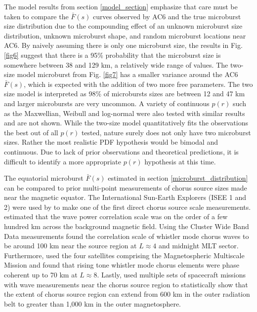 \documentclass[draft]{agujournal2019}
\begin{document}
The model results from section \ref{model_section} emphasize that care must be taken to compare the $\bar{F}(s)$ curves observed by AC6 and the true microburst size distribution due to the compounding effect of an unknown microburst size distribution, unknown microburst shape, and random microburst locations near AC6. By naively assuming there is only one microburst size, the results in Fig. \ref{fig6} suggest that there is a 95\% probability that the microburst size is somewhere between 38 and 129 km, a relatively wide range of values. The two-size model microburst from Fig. \ref{fig7} has a smaller variance around the AC6 $\bar{F}(s)$, which is expected with the addition of two more free parameters. The two size model is interpreted as 98\% of microbursts sizes are between 12 and 47 km and larger microbursts are very uncommon. A variety of continuous $p(r)$ such as the Maxwellian, Weibull and log-normal were also tested with similar results and are not shown. While the two-size model quantitatively fits the observations the best out of all $p(r)$ tested, nature surely does not only have two microburst sizes. Rather the most realistic PDF hypothesis would be bimodal and continuous. Due to lack of prior observations and theoretical predictions, it is difficult to identify a more appropriate $p(r)$ hypothesis at this time.

The equatorial microburst $\bar{F}(s)$ estimated in section \ref{microburst_distribution} can be compared to prior multi-point measurements of chorus source sizes made near the magnetic equator. The International Sun-Earth Explorers (ISEE 1 and 2) were used by  to make one of the first direct chorus source scale measurements.  estimated that the wave power correlation scale was on the order of a few hundred km across the background magnetic field. Using the Cluster Wide Band Data measurements  found the correlation scale of whistler mode chorus waves to be around 100 km near the source region at $L \approx 4$ and midnight MLT sector. Furthermore,  used the four satellites comprising the Magnetospheric Multiscale Mission and found that rising tone whistler mode chorus elements were phase coherent up to 70 km at $L \approx 8$. Lastly,  used multiple sets of spacecraft missions with wave measurements near the chorus source region to statistically show that the extent of chorus source region can extend from 600 km in the outer radiation belt to greater than 1,000 km in the outer magnetosphere. 
\end{document}
